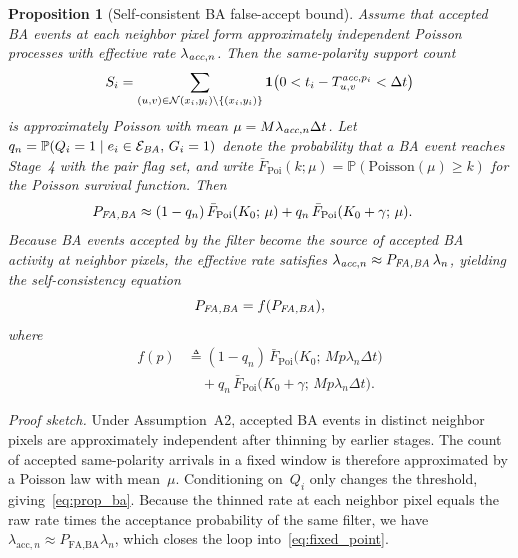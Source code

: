 \documentclass[a4paper,fleqn]{cas-dc}
\newtheorem{proposition}[theorem]{Proposition}
\newcommand{\ind}[1]{\mathbf{1}\!\left(#1\right)}
\newcommand{\Prob}{\mathbb{P}}
\newcommand{\Fbar}{\bar{F}}
\begin{document}
\begin{proposition}[Self-consistent BA false-accept bound]
\label{prop:ba}
Assume that accepted BA events at each neighbor pixel form approximately independent Poisson processes with effective rate $\lambda_{\emph{acc},n}$. Then the same-polarity support count
\[
S_i = \sum_{(u,v)\in\mathcal{N}(x_i,y_i)\setminus\{(x_i,y_i)\}}
\ind{0 < t_i - T_{u,v}^{\emph{acc},p_i} < \Delta t}
\]
is approximately Poisson with mean $\mu = M \lambda_{\emph{acc},n}\Delta t$.
Let $q_n = \Prob(Q_i = 1 \mid e_i \in \mathcal{E}_{\emph{BA}},\, G_i = 1)$ denote the probability that a BA event reaches Stage~4 with the pair flag set, and write $\Fbar_{\mathrm{Poi}}(k;\mu) = \Prob(\mathrm{Poisson}(\mu)\geq k)$ for the Poisson survival function. Then
\begin{equation}
\begin{aligned}
P_{\emph{FA,BA}}
&\approx (1-q_n)\,\Fbar_{\mathrm{Poi}}(K_0;\,\mu) + q_n\,\Fbar_{\mathrm{Poi}}(K_0+\gamma;\,\mu).
\end{aligned}
\label{eq:prop_ba}
\end{equation}
Because BA events accepted by the filter become the source of accepted BA activity at neighbor pixels, the effective rate satisfies $\lambda_{\emph{acc},n}\approx P_{\emph{FA,BA}}\,\lambda_n$, yielding the self-consistency equation
\begin{equation}
P_{\emph{FA,BA}} = f(P_{\emph{FA,BA}}),
\label{eq:fixed_point}
\end{equation}
where
\begin{equation}
\begin{split}
f(p) &\triangleq (1{-}q_n)\,\Fbar_{\mathrm{Poi}}\!\bigl(K_0;\,M p\lambda_n\Delta t\bigr) \\
&\quad + q_n\,\Fbar_{\mathrm{Poi}}\!\bigl(K_0{+}\gamma;\,M p\lambda_n\Delta t\bigr).
\end{split}
\label{eq:f_def}
\end{equation}
\end{proposition}

\noindent\textit{Proof sketch.}
Under Assumption~A2, accepted BA events in distinct neighbor pixels are approximately independent after thinning by earlier stages. The count of accepted same-polarity arrivals in a fixed window is therefore approximated by a Poisson law with mean~$\mu$. Conditioning on~$Q_i$ only changes the threshold, giving~\eqref{eq:prop_ba}. Because the thinned rate at each neighbor pixel equals the raw rate times the acceptance probability of the same filter, we have $\lambda_{\text{acc},n}\approx P_{\text{FA,BA}}\lambda_n$, which closes the loop into~\eqref{eq:fixed_point}.
\end{document}
